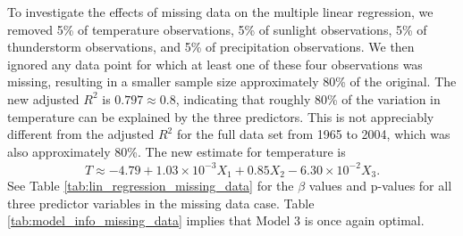 To investigate the effects of missing data on the multiple linear regression, we removed 5\% of temperature observations, 5\% of sunlight observations, 5\% of thunderstorm observations, and 5\% of precipitation observations. We then ignored any data point for which at least one of these four observations was missing, resulting in a smaller sample size approximately 80\% of the original. The new adjusted $R^{2}$ is $0.797 \approx 0.8$, indicating that roughly 80\% of the variation in temperature can be explained by the three predictors. This is not appreciably different from the adjusted $R^{2}$ for the full data set from 1965 to 2004, which was also approximately 80\%. The new estimate for temperature is $$\hat{T} \approx -4.79 + 1.03 \times 10^{-3}X_{1} + 0.85X_{2} - 6.30\times 10^{-2}X_{3}.$$ See Table \ref{tab:lin_regression_missing_data} for the $\beta$ values and p-values for all three predictor variables in the missing data case. Table \ref{tab:model_info_missing_data} implies that Model 3 is once again optimal.
